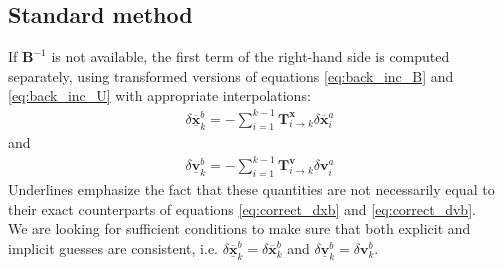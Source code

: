 \documentclass[12pt]{scrartcl}
\begin{document}
\subsection{Standard method}
If $\mathbf{B}^{-1}$ is not available, the first term of the right-hand side is computed separately, using transformed versions of equations \eqref{eq:back_inc_B} and \eqref{eq:back_inc_U} with appropriate interpolations:
\begin{align}
\label{eq:back_inc_Bvar}
\boxed{\delta \underline{\overline{\mathbf{x}}}^b_k = - \sum_{i=1}^{k-1} \mathbf{T}^\mathbf{x}_{i \rightarrow k} \delta \overline{\mathbf{x}}^a_i}
\end{align}
and 
\begin{align}
\label{eq:back_inc_Uvar}
\boxed{\delta \underline{\mathbf{v}}^b_k = - \sum_{i=1}^{k-1} \mathbf{T}^\mathbf{v}_{i \rightarrow k} \delta \mathbf{v}^a_i}
\end{align}
Underlines emphasize the fact that these quantities are not necessarily equal to their exact counterparts of equations \eqref{eq:correct_dxb} and \eqref{eq:correct_dvb}.\\
$  $\\
We are looking for sufficient conditions to make sure that both explicit and implicit guesses are consistent, i.e. $\delta \underline{\overline{\mathbf{x}}}^b_k = \delta \overline{\mathbf{x}}^b_k$ and $\delta \underline{\mathbf{v}}^b_k = \delta \mathbf{v}^b_k$.
\end{document}

